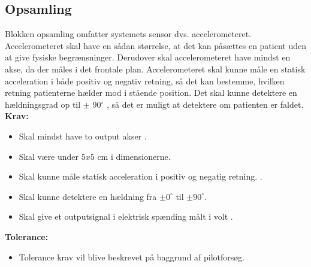 \subsection{Opsamling}
Blokken opsamling omfatter systemets sensor dvs. accelerometeret. Accelerometeret skal have en sådan størrelse, at det kan påsættes en patient uden at give fysiske begrænsninger. Derudover skal accelerometeret have mindst en akse, da der måles i det frontale plan. %
Accelerometeret skal kunne måle en statisk acceleration i både positiv og negativ retning, så det kan bestemme, hvilken retning patienterne hælder mod i stående position.  %
Det skal kunne detektere en hældningsgrad op til $\pm$ 90$^{\circ}$ , så det er muligt at detektere om patienten er faldet. \\
\textbf{Krav:}
\begin{itemize}
\item Skal mindst have to output akser .
\item Skal være under $5x5$ cm i dimensionerne.
\item Skal kunne måle statisk acceleration i positiv og negatig retning. .
\item Skal kunne detektere en hældning fra $\pm 0^{\circ}$ til $\pm 90^{\circ}$.
\item Skal give et outputsignal i elektrisk spænding målt i volt .
\end{itemize}
\textbf{Tolerance:}
\begin{itemize}
\item Tolerance krav vil blive beskrevet på baggrund af pilotforsøg.
\end{itemize}
